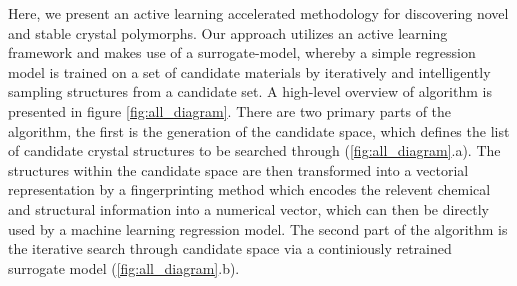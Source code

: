 %
%
Here, we present an active learning accelerated methodology for discovering novel and stable crystal polymorphs.
%
Our approach utilizes an active learning framework and makes use of a surrogate-model,
whereby a simple regression model is trained on a set of candidate materials by iteratively and intelligently sampling structures from a candidate set.
%
A high-level overview of algorithm is presented in figure \ref{fig:all_diagram}.
There are two primary parts of the algorithm, the first is the generation of the candidate space,
which defines the list of candidate crystal structures to be searched through (\ref{fig:all_diagram}.a).
%
The structures within the candidate space are then transformed into a vectorial representation by a fingerprinting method which encodes the relevent chemical and structural information into a numerical vector,
which can then be directly used by a machine learning regression model.
%
The second part of the algorithm is the iterative search through candidate space via a continiously retrained surrogate model (\ref{fig:all_diagram}.b).


